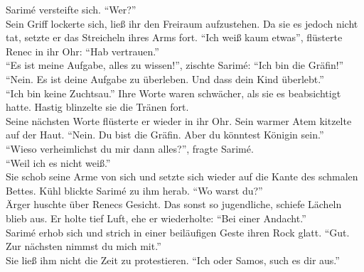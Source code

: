 Sarimé versteifte sich. ``Wer?''\\
Sein Griff lockerte sich, ließ ihr den Freiraum aufzustehen. Da sie es jedoch nicht tat, setzte er 
das Streicheln ihres Arms fort. ``Ich weiß kaum etwas'', flüsterte Renec in ihr Ohr: ``Hab 
vertrauen.''\\
``Es ist meine Aufgabe, alles zu wissen!'', zischte Sarimé: ``Ich bin die Gräfin!''\\
``Nein. Es ist deine Aufgabe zu überleben. Und dass dein Kind überlebt.''\\
``Ich bin keine Zuchtsau.'' Ihre Worte waren schwächer, als sie es beabsichtigt hatte. Hastig 
blinzelte sie die Tränen fort.\\
Seine nächsten Worte flüsterte er wieder in ihr Ohr. Sein warmer Atem kitzelte auf der Haut. 
``Nein. Du bist die Gräfin. Aber du könntest Königin sein.''\\
``Wieso verheimlichst du mir dann alles?'', fragte Sarimé.\\
``Weil ich es nicht weiß.''\\
Sie schob seine Arme von sich und setzte sich wieder auf die Kante des schmalen Bettes. Kühl 
blickte Sarimé zu ihm herab. ``Wo warst du?''\\
Ärger huschte über Renecs  Gesicht. Das sonst so jugendliche, schiefe Lächeln blieb aus. Er holte 
tief Luft, ehe er wiederholte: ``Bei einer Andacht.''\\
Sarimé erhob sich und strich in einer beiläufigen Geste ihren Rock glatt. ``Gut. Zur nächsten 
nimmst du mich mit.''\\
Sie ließ ihm nicht die Zeit zu protestieren. ``Ich oder Samos, such es dir aus.''\\










